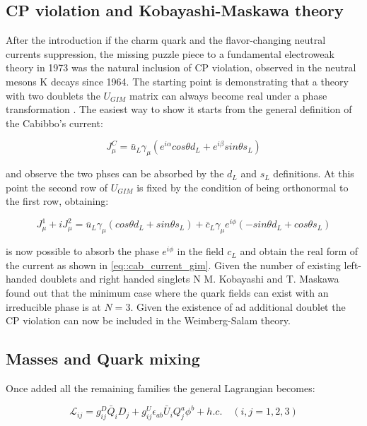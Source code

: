 \subsection{CP violation and Kobayashi-Maskawa theory}

After the introduction if the charm quark and the flavor-changing neutral currents suppression, the missing puzzle piece to a fundamental electroweak theory in 1973 was the natural inclusion of CP violation, observed in the neutral mesons K decays since 1964. 
The starting point is demonstrating that a theory with two doublets the $U_{GIM}$ matrix can always become real under a phase transformation \cite{Glashow:1970gm}. The easiest way to show it starts from the general definition of the Cabibbo's current:

\begin{equation}
J^{C}_{\mu} = \bar{u}_{L}\gamma_{\mu}\left( e^{i\alpha} cos\theta d_{L} + e^{i\beta} sin\theta s_{L}   \right)
\end{equation}

and observe the two phses can be absorbed by the $d_{L}$ and $s_{L}$ definitions. At this point the second row of $U_{GIM}$ is fixed by the condition of being orthonormal to the first row, obtaining:

\begin{equation}
J^{1}_{\mu} + i J^{2}_{\mu} =  \bar{u}_{L}\gamma_{\mu} \left(cos\theta d_{L} + sin\theta s_{L}\right) + \bar{c}_{L}\gamma_{\mu}e^{i\phi} (-sin\theta d_{L} + cos\theta s_{L})
\end{equation}

is now possible to absorb the phase $e^{i\phi}$ in the field $c_{L}$ and obtain the real form of the current as shown in \ref{eq::cab_current_gim}. Given the number of existing left-handed doublets and right handed singlets N M. Kobayashi and T. Maskawa found out that the minimum case where the quark fields can exist with an irreducible phase is at $N = 3$. Given the existence of ad additional doublet the CP violation can now be included in the Weimberg-Salam theory.

\subsection{Masses and Quark mixing}

Once added all the remaining families the general Lagrangian becomes:

\begin{equation}
\mathcal{L}_{ij} = g^{D}_{ij}\bar{Q}_{i}D_{j} + g^{U}_{ij}\epsilon_{ab}\bar{U}_{i}Q^{a}_{j}\phi^{b} + h.c. \quad (i,j = 1,2,3)
\end{equation}

